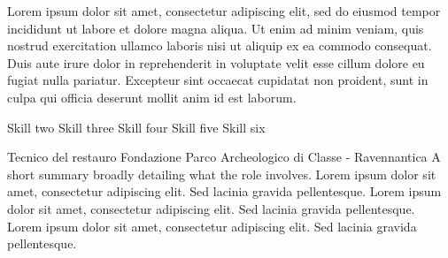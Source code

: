 \documentclass[a4paper]{ReadableCV}
\begin{document}
	





\setYourWebAddr{}


\showHeader


\newHeading{}

Lorem ipsum dolor sit amet, consectetur adipiscing elit, sed do eiusmod tempor incididunt ut labore et dolore magna aliqua. Ut enim ad minim veniam, quis nostrud exercitation ullamco laboris nisi ut aliquip ex ea commodo consequat. Duis aute irure dolor in reprehenderit in voluptate velit esse cillum dolore eu fugiat nulla pariatur. Excepteur sint occaecat cupidatat non proident, sunt in culpa qui officia deserunt mollit anim id est laborum.


		  {Skill two}
		  {Skill three}
		  {Skill four}
		  {Skill five}
		  {Skill six}
		  {}
		  {}
		  {}
		  


{}
        {Tecnico del restauro}
        {Fondazione Parco Archeologico di Classe - Ravennantica}
        {A short summary broadly detailing what the role involves. Lorem ipsum dolor sit amet, consectetur adipiscing elit. Sed lacinia gravida pellentesque. Lorem ipsum dolor sit amet, consectetur adipiscing elit. Sed lacinia gravida pellentesque. Lorem ipsum dolor sit amet, consectetur adipiscing elit. Sed lacinia gravida pellentesque.}
\end{document}
